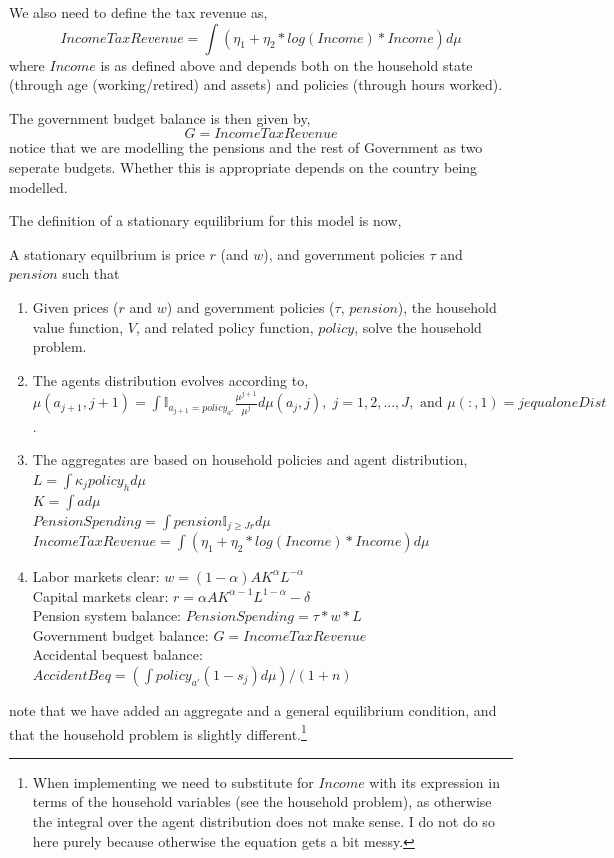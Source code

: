 We also need to define the tax revenue as,
\begin{equation*}
 IncomeTaxRevenue=\int (\eta_1+\eta_2*log(Income)*Income) d\mu
\end{equation*}
where $Income$ is as defined above and depends both on the household state (through age (working/retired) and assets) and policies (through hours worked).

The government budget balance is then given by,
\begin{equation*}
 G=IncomeTaxRevenue
\end{equation*}
notice that we are modelling the pensions and the rest of Government as two seperate budgets. Whether this is appropriate depends on the country being modelled.

The definition of a stationary equilibrium for this model is now,
\begin{definition}
 A stationary equilbrium is price $r$ (and $w$), and government policies $\tau$ and $pension$ such that
 \begin{enumerate}
  \item Given prices ($r$ and $w$) and government policies ($\tau$, $pension$), the household value function, $V$, and related policy function, $policy$, solve the household problem.
  \item The agents distribution evolves according to,
   \\  $\mu(a_{j+1},j+1)=\int \mathbb{I}_{a_{j+1}=policy_{a'}} \frac{\mu^{j+1}}{\mu^j} d\mu(a_j,j), \; j=1,2,...,J,\text{ and } \mu(:,1)=jequaloneDist$.
  \item The aggregates are based on household policies and agent distribution,
   \\ $L=\int \kappa_j policy_h d\mu$
   \\ $K=\int a d\mu$
   \\ $PensionSpending=\int pension \mathbb{I}_{j\geq Jr} d\mu$
   \\ $IncomeTaxRevenue=\int (\eta_1+\eta_2*log(Income)*Income) d\mu$
  \item Labor markets clear: $w=(1-\alpha)A K^{\alpha}L^{-\alpha}$
   \\ Capital markets clear: $r=\alpha A K^{\alpha-1} L^{1-\alpha} - \delta$
   \\ Pension system balance: $PensionSpending=\tau*w*L$
   \\ Government budget balance: $G=IncomeTaxRevenue$
   \\ Accidental bequest balance: $AccidentBeq=(\int policy_{a'}(1-s_j) d\mu)/(1+n)$
 \end{enumerate}
\end{definition}
\noindent note that we have added an aggregate and a general equilibrium condition, and that the household problem is slightly different.\footnote{When implementing we need to substitute for $Income$ with its expression in terms of the household variables (see the household problem), as otherwise the integral over the agent distribution does not make sense. I do not do so here purely because otherwise the equation gets a bit messy.}

